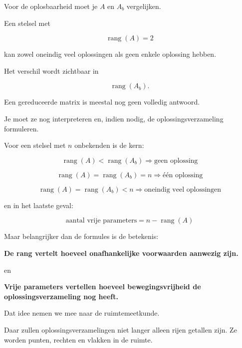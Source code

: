 \documentclass{ximera}
\begin{document}
\begin{opmerking}

Voor de oplosbaarheid moet je \(A\) en \(A_b\) vergelijken.

Een stelsel met

\[
\operatorname{rang}(A)=2
\]

kan zowel oneindig veel oplossingen als geen enkele oplossing hebben.

Het verschil wordt zichtbaar in

\[
\operatorname{rang}(A_b).
\]
\end{opmerking}


\begin{opmerking}

Een gereduceerde matrix is meestal nog geen volledig antwoord.

Je moet ze nog interpreteren en, indien nodig,
de oplossingsverzameling formuleren.
\end{opmerking}





Voor een stelsel met \(n\) onbekenden is de kern:

\[
\boxed{
\operatorname{rang}(A)<\operatorname{rang}(A_b)
\Longrightarrow
\text{geen oplossing}
}
\]

\[
\boxed{
\operatorname{rang}(A)
=
\operatorname{rang}(A_b)
=
n
\Longrightarrow
\text{één oplossing}
}
\]

\[
\boxed{
\operatorname{rang}(A)
=
\operatorname{rang}(A_b)
<
n
\Longrightarrow
\text{oneindig veel oplossingen}
}
\]

en in het laatste geval:

\[
\boxed{
\text{aantal vrije parameters}
=
n-\operatorname{rang}(A)
}
\]


Maar belangrijker dan de formules is de betekenis:

\begin{center}
\textbf{De rang vertelt hoeveel onafhankelijke voorwaarden aanwezig zijn.}
\end{center}

en

\begin{center}
\textbf{Vrije parameters vertellen hoeveel bewegingsvrijheid
de oplossingsverzameling nog heeft.}
\end{center}

Dat idee nemen we mee naar de ruimtemeetkunde.

Daar zullen oplossingsverzamelingen niet langer alleen rijen getallen zijn.
Ze worden punten, rechten en vlakken in de ruimte.
\end{document}
